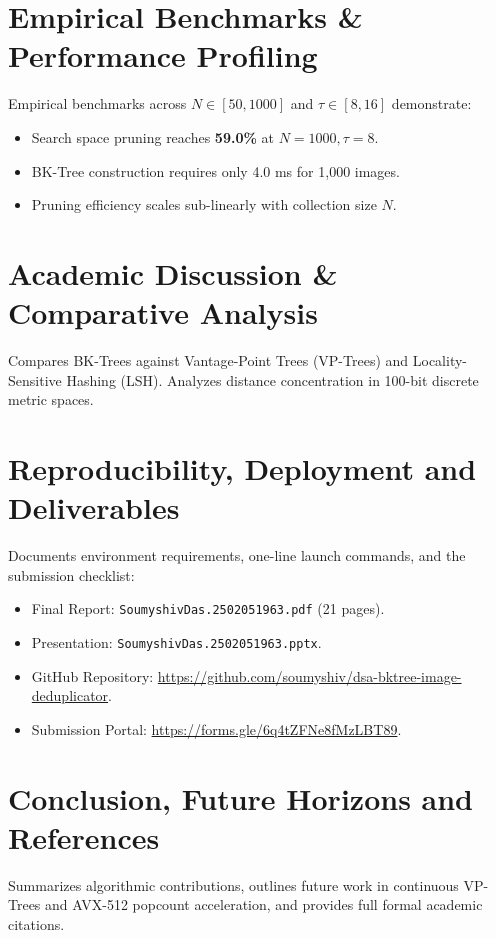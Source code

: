 \documentclass[11pt,a4paper]{article}
\begin{document}
\section{Empirical Benchmarks \& Performance Profiling}
Empirical benchmarks across $N \in [50, 1000]$ and $\tau \in [8, 16]$ demonstrate:
\begin{itemize}
    \item Search space pruning reaches \textbf{59.0\%} at $N = 1000, \tau = 8$.
    \item BK-Tree construction requires only 4.0 ms for 1,000 images.
    \item Pruning efficiency scales sub-linearly with collection size $N$.
\end{itemize}

\section{Academic Discussion \& Comparative Analysis}
Compares BK-Trees against Vantage-Point Trees (VP-Trees) and Locality-Sensitive Hashing (LSH). Analyzes distance concentration in 100-bit discrete metric spaces.

\section{Reproducibility, Deployment and Deliverables}
Documents environment requirements, one-line launch commands, and the submission checklist:
\begin{itemize}
    \item Final Report: \texttt{SoumyshivDas.2502051963.pdf} (21 pages).
    \item Presentation: \texttt{SoumyshivDas.2502051963.pptx}.
    \item GitHub Repository: \url{https://github.com/soumyshiv/dsa-bktree-image-deduplicator}.
    \item Submission Portal: \url{https://forms.gle/6q4tZFNe8fMzLBT89}.
\end{itemize}

\section{Conclusion, Future Horizons and References}
Summarizes algorithmic contributions, outlines future work in continuous VP-Trees and AVX-512 popcount acceleration, and provides full formal academic citations.
\end{document}
